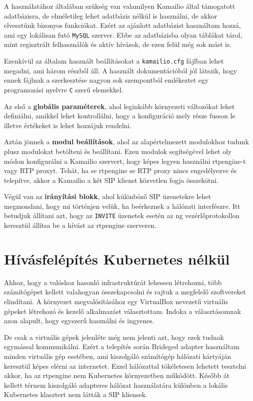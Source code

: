 A használatához általában szükség van valamilyen Kamailio által támogatott adatbázisra,
de elméletileg lehet adatbázis nélkül is használni, de akkor elvesztünk bizonyos 
funkciókat. Ezért az ajánlott adatbázist használtam hozzá, ami egy lokálisan futó 
\texttt{MySQL} szerver. Ebbe az adatbázisba olyan táblákat tárol, mint regisztrált 
felhasználók és aktív hívások, de ezen felül még sok mást is. 

Ezenkívül az általam használt beállításokat a \texttt{kamailio.cfg} fájlban lehet megadni,
ami három részből áll. A használt dokumentációból \cite{kamailio} jól látszik, hogy ennek
fájlnak a szerkesztése nagyon sok szempontból emlékeztet egy programozási nyelvre 
\texttt{C} szerű elemekkel.  

Az első a \textbf{globális paraméterek}, ahol leginkább környezeti változókat lehet 
definiálni, amikkel lehet kontrollálni, hogy a konfiguráció mely része fusson le illetve
értékeket is lehet hozzájuk rendelni. 

Aztán jönnek a \textbf{modul beállítások}, ahol az alapértelmezett modulokhoz tudunk plusz
modulokat betölteni és beállítani. Ezen modulok segítségével lehet oly módon konfigurálni 
a Kamailio szervert, hogy képes legyen használni rtpengine-t vagy RTP proxyt. Tehát, ha 
se rtpengine se RTP proxy nincs engedélyezve és telepítve, akkor a Kamailio a két SIP 
klienst közvetlen fogja összekötni.

Végül van az \textbf{irányítási blokk}, ahol különböző SIP üzenetekre lehet megmondani, 
hogy mi történjen velük, ha beérkeznek a hálózati interfészre. Itt betudjuk állítani azt, 
hogy az \texttt{INVITE} üzenetek esetén az ng vezérlőprotokollon keresztül állítsa be a 
hívást az rtpengine szerveren.

\section{Hívásfelépítés Kubernetes nélkül}

Ahhoz, hogy a valóshoz hasonló infrastruktúrát lehessen létrehozni, több 
számítógépet kellett valahogyan összekapcsolni és rajtuk a megfelelő szoftvereket
elindítani. A környezet megvalósításához egy VirtualBox nevezetű virtuális gépeket
létrehozó és kezelő alkalmazást választottam. Indoka a választásomnak azon
alapult, hogy egyszerű használni és ingyenes.

De csak a virtuális gépek jelenléte még nem jelenti azt, hogy ezek tudnak egymással
kommunikálni. Ezért a telepítés során Brideged adapter használtam minden
virtuális gép esetében, ami kiszolgáló számítógép hálózati kártyáján keresztül
képes elérni az internetet. Ezzel hálózattal tökéletesen lehetett tesztelni
akkor, ha az rtpengine nem Kubernetes környezetben működött. Később át kellett
térnem kiszolgáló adapteres hálózat használatára különben a lokális Kubernetes 
klasztert nem látták a SIP kliensek. 

